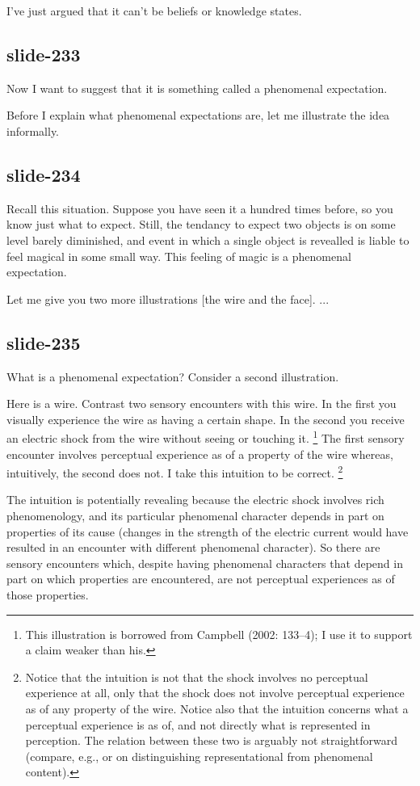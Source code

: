 \documentclass[12pt,\papersize]{extarticle}
\begin{document}
I’ve just argued that it can’t be beliefs or knowledge states.

\subsection{slide-233}
Now I want to suggest that it is something called a phenomenal expectation.

Before I explain what phenomenal expectations are, let me illustrate the
idea informally.

\subsection{slide-234}
Recall this situation.
Suppose you have seen it a hundred times before, so you know just what
to expect.
Still, the tendancy to expect two objects is on some level barely
diminished, and event in which a single object is revealled
is liable to feel magical in some small way.
This feeling of magic is a phenomenal expectation.

Let me give you two more illustrations [the wire and the face]. ...

\subsection{slide-235}
What is a phenomenal expectation?  Consider a second illustration.

Here is a wire.
Contrast two sensory encounters with this wire. In the first you visually
experience the wire as having a certain shape. In the second you receive an
electric shock from the wire without seeing or touching it.%
\footnote{This illustration is borrowed from Campbell (2002: 133–4); I use it to support a claim weaker than his.}
The first sensory encounter involves perceptual experience as of a property of
the wire whereas, intuitively, the second does not.
I take this intuition to be correct.%
\footnote{
Notice that the intuition is not that the shock involves no
perceptual experience at all, only that the shock does not involve
perceptual experience as of any property of the wire. Notice also that the
intuition concerns what a perceptual experience is as of, and not directly
what is represented in perception. The relation between these two is
arguably not straightforward (compare, e.g., \citet[p.~28]{Shoemaker:1994el} or
\citet[pp.~50--2]{Chalmers:2006xq} on distinguishing representational from
phenomenal content).
}

The intuition is potentially revealing because the electric shock involves
rich phenomenology, and its particular phenomenal character depends in part
on properties of its cause (changes in the strength of the electric current
would have resulted in an encounter with different phenomenal character).
So there are sensory encounters which, despite having phenomenal characters
that depend in part on which properties are encountered, are not perceptual
experiences as of those properties.
\end{document}
